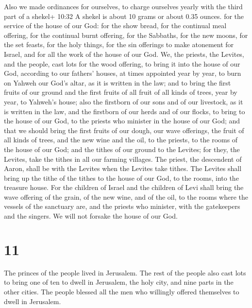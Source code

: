  Also we made ordinances for ourselves, to charge ourselves
yearly with the third part of a shekel+ 10:32 A shekel is about 10 grams
or about 0.35 ounces. for the service of the house of our God:
 for the show bread, for the continual meal offering, for
the continual burnt offering, for the Sabbaths, for the new moons, for
the set feasts, for the holy things, for the sin offerings to make
atonement for Israel, and for all the work of the house of our God.
 We, the priests, the Levites, and the people, cast lots
for the wood offering, to bring it into the house of our God, according
to our fathers' houses, at times appointed year by year, to burn on
Yahweh our God's altar, as it is written in the law;  and
to bring the first fruits of our ground and the first fruits of all
fruit of all kinds of trees, year by year, to Yahweh's house;
 also the firstborn of our sons and of our livestock, as it
is written in the law, and the firstborn of our herds and of our flocks,
to bring to the house of our God, to the priests who minister in the
house of our God;  and that we should bring the first
fruits of our dough, our wave offerings, the fruit of all kinds of
trees, and the new wine and the oil, to the priests, to the rooms of the
house of our God; and the tithes of our ground to the Levites; for they,
the Levites, take the tithes in all our farming villages. 
The priest, the descendent of Aaron, shall be with the Levites when the
Levites take tithes. The Levites shall bring up the tithe of the tithes
to the house of our God, to the rooms, into the treasure house.
 For the children of Israel and the children of Levi shall
bring the wave offering of the grain, of the new wine, and of the oil,
to the rooms where the vessels of the sanctuary are, and the priests who
minister, with the gatekeepers and the singers. We will not forsake the
house of our God.

\hypertarget{section-10}{%
\section{11}\label{section-10}}

 The princes of the people lived in Jerusalem. The rest of
the people also cast lots to bring one of ten to dwell in Jerusalem, the
holy city, and nine parts in the other cities.  The people
blessed all the men who willingly offered themselves to dwell in
Jerusalem.

